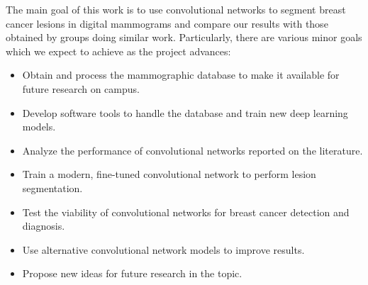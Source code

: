 The main goal of this work is to use convolutional networks to segment breast cancer lesions in digital mammograms and compare our results with those obtained by groups doing similar work.
Particularly, there are various minor goals which we expect to achieve as the project advances:
\begin{itemize}
	\item Obtain and process the mammographic database to make it available for future research on campus.
	\item Develop software tools to handle the database and train new deep learning models.
	\item Analyze the performance of convolutional networks reported on the literature.
	\item Train a modern, fine-tuned convolutional network to perform lesion segmentation.
	\item Test the viability of convolutional networks for breast cancer detection and diagnosis.
	\item Use alternative convolutional network models to improve results.
	\item Propose new ideas for future research in the topic.
\end{itemize}
